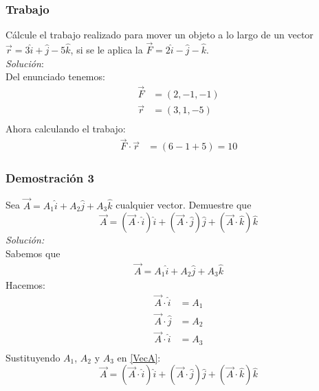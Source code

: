 \documentclass[12pt,openany]{book}
\begin{document}
			\subsubsection{Trabajo}
				C\'alcule el trabajo realizado para mover un objeto a lo largo de un
				vector $\vec{r}=3\hat{i}+\hat{j}-5\hat{k}$, si se le aplica
				la $\vec{F}=2\hat{i}-\hat{j}-\hat{k}$.\\
				\noindent\textsl{Soluci\'on}:\\
				Del enunciado tenemos:
				\begin{equation*}
					\begin{split}
						\vec{F}&=(2,-1,-1)\\
						\vec{r}&=(3,1,-5)\\
					\end{split}
				\end{equation*}
				Ahora calculando el trabajo:
				\begin{equation*}
					\begin{split}
						\vec{F}\cdot\vec{r}&=(6-1+5)=10
					\end{split}
				\end{equation*}
			\subsubsection{Demostraci\'on 3}
				Sea $\vec{A}=A_{1}\hat{i}+A_{2}\hat{j}+A_{3}\hat{k}$ cualquier vector.
				Demuestre que 
				$$
					\vec{A}=(\vec{A}\cdot\hat{i})\hat{i}+(\vec{A}\cdot\hat{j})\hat{j}
										+(\vec{A}\cdot\hat{k})\hat{k}
				$$
				\noindent\textsl{Soluci\'on:}\\
				Sabemos que
				\begin{equation}
					\begin{split}
						\vec{A}=A_{1}\hat{i}+A_{2}\hat{j}+A_{3}\hat{k} 
					\end{split}
					\label{VecA}
				\end{equation}
				Hacemos:
				\begin{equation*}
					\begin{split}
						\vec{A}\cdot\hat{i}&=A_{1}\\
						\vec{A}\cdot\hat{j}&=A_{2}\\
						\vec{A}\cdot\hat{i}&=A_{3}\\
					\end{split}
				\end{equation*}
				Sustituyendo $A_{1}$, $A_{2}$ y $A_{3}$ en \ref{VecA}:
				$$
					\vec{A}=(\vec{A}\cdot\hat{i})\hat{i}+(\vec{A}\cdot\hat{j})\hat{j}
										+(\vec{A}\cdot\hat{k})\hat{k}
				$$				
\end{document}
